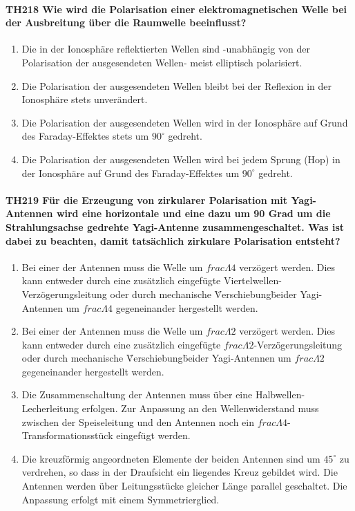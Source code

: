 \documentclass[8pt]{article}
\begin{document}
\paragraph*{TH218 Wie wird die Polarisation einer elektromagnetischen Welle bei der Ausbreitung über die Raumwelle beeinflusst?}
\begin{enumerate}[nolistsep,label=\Alph*]
\item Die in der Ionosphäre reflektierten Wellen sind -unabhängig von der Polarisation der ausgesendeten Wellen- meist elliptisch polarisiert.
\item Die Polarisation der ausgesendeten Wellen bleibt bei der Reflexion in der Ionosphäre stets unverändert.
\item Die Polarisation der ausgesendeten Wellen wird in der Ionosphäre auf Grund des Faraday-Effektes stets um $90^{\circ}$ gedreht.
\item Die Polarisation der ausgesendeten Wellen wird bei jedem Sprung (Hop) in der Ionosphäre auf Grund des Faraday-Effektes um $90^{\circ}$ gedreht.
\end{enumerate}

\paragraph*{TH219 Für die Erzeugung von zirkularer Polarisation mit Yagi-Antennen wird eine horizontale und eine dazu um 90 Grad um die Strahlungsachse gedrehte Yagi-Antenne zusammengeschaltet. Was ist dabei zu beachten, damit tatsächlich zirkulare Polarisation entsteht?}
\begin{enumerate}[nolistsep,label=\Alph*]
\item Bei einer der Antennen muss die Welle um $frac{\Lambda}{4}$ verzögert werden. Dies kann entweder durch eine zusätzlich eingefügte Viertelwellen-Verzögerungsleitung oder durch mechanische \"Verschiebung\" beider Yagi-Antennen um $frac{\Lambda}{4}$ gegeneinander hergestellt werden. 
\item Bei einer der Antennen muss die Welle um $frac{\Lambda}{2}$ verzögert werden. Dies kann entweder durch eine zusätzlich eingefügte $frac{\Lambda}{2}$-Verzögerungsleitung oder durch mechanische \"Verschiebung\" beider Yagi-Antennen um $frac{\Lambda}{2}$ gegeneinander hergestellt werden. 
\item Die Zusammenschaltung der Antennen muss über eine Halbwellen-Lecherleitung erfolgen. Zur Anpassung an den Wellenwiderstand muss zwischen der Speiseleitung und den Antennen noch ein $frac{\Lambda}{4}$-Transformationsstück eingefügt werden.
\item Die kreuzförmig angeordneten Elemente der beiden Antennen sind um $45^{\circ}$ zu verdrehen, so dass in der Draufsicht ein liegendes Kreuz gebildet wird. Die Antennen werden über Leitungsstücke gleicher Länge parallel geschaltet. Die Anpassung erfolgt mit einem Symmetrierglied. 
\end{enumerate}
\end{document}
